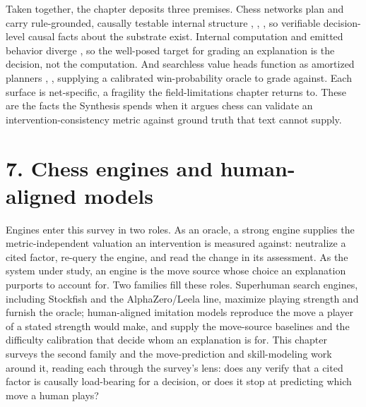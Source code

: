 \documentclass[conference]{IEEEtran}
\begin{document}
Taken together, the chapter deposits three premises. Chess networks plan and carry rule-grounded, causally testable internal structure \cite{ref4}, \cite{ref6}, \cite{ref23}, so verifiable decision-level causal facts about the substrate exist. Internal computation and emitted behavior diverge \cite{ref5}, so the well-posed target for grading an explanation is the decision, not the computation. And searchless value heads function as amortized planners \cite{ref7}, \cite{ref52}, supplying a calibrated win-probability oracle to grade against. Each surface is net-specific, a fragility the field-limitations chapter returns to. These are the facts the Synthesis spends when it argues chess can validate an intervention-consistency metric against ground truth that text cannot supply.

\section*{7. Chess engines and human-aligned models}
Engines enter this survey in two roles. As an oracle, a strong engine supplies the metric-independent valuation an intervention is measured against: neutralize a cited factor, re-query the engine, and read the change in its assessment. As the system under study, an engine is the move source whose choice an explanation purports to account for. Two families fill these roles. Superhuman search engines, including Stockfish and the AlphaZero/Leela line, maximize playing strength and furnish the oracle; human-aligned imitation models reproduce the move a player of a stated strength would make, and supply the move-source baselines and the difficulty calibration that decide whom an explanation is for. This chapter surveys the second family and the move-prediction and skill-modeling work around it, reading each through the survey's lens: does any verify that a cited factor is causally load-bearing for a decision, or does it stop at predicting which move a human plays?
\end{document}

